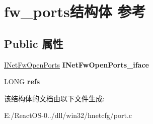 \hypertarget{structfw__ports}{}\section{fw\+\_\+ports结构体 参考}
\label{structfw__ports}
\subsection*{Public 属性}
\begin{DoxyCompactItemize}
\item 
\mbox{\label{structfw__ports_aff0f527d496c200fd6deb4237717403f}} 
\hyperlink{interface_i_net_fw_open_ports}{I\+Net\+Fw\+Open\+Ports} {\bfseries I\+Net\+Fw\+Open\+Ports\+\_\+iface}
\item 
\mbox{\label{structfw__ports_af106bb4fd0b6ff1c484fa0230042d6b2}} 
L\+O\+NG {\bfseries refs}
\end{DoxyCompactItemize}


该结构体的文档由以下文件生成\+:\begin{DoxyCompactItemize}
\item 
E\+:/\+React\+O\+S-\/0../dll/win32/hnetcfg/port.\+c\end{DoxyCompactItemize}
